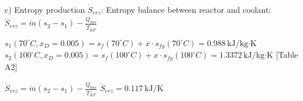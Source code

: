 c) Entropy production \( \dot{S}_{erz} \):  
Entropy balance between reactor and coolant:  
\( \dot{S}_{erz} = \dot{m} (s_2 - s_1) - \frac{\dot{Q}_{aus}}{\dot{T}_{KF}} \)  

\( s_1 (70^\circ C, x_D = 0.005) = s_f (70^\circ C) + x \cdot s_{fg} (70^\circ C) = 0.988 \, \text{kJ/kg·K} \)  
\( s_2 (100^\circ C, x_D = 0.005) = s_f (100^\circ C) + x \cdot s_{fg} (100^\circ C) = 1.3372 \, \text{kJ/kg·K} \)  
[Table A2]  

\( \dot{S}_{erz} = \dot{m} (s_2 - s_1) - \frac{\dot{Q}_{aus}}{\dot{T}_{KF}} \)  
\( \dot{S}_{erz} = 0.117 \, \text{kJ/K} \)